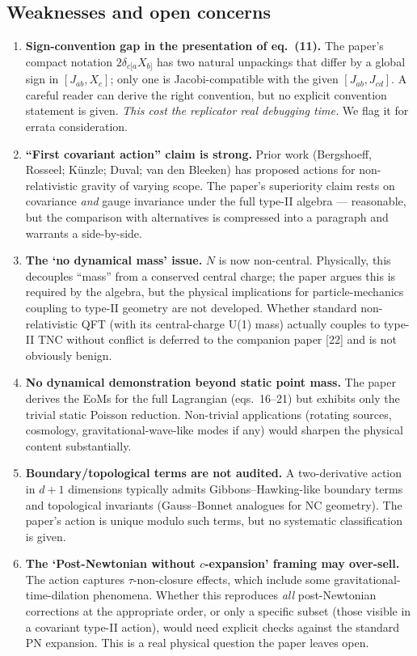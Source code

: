 \documentclass[11pt]{article}
\begin{document}
\subsection{Weaknesses and open concerns}
\begin{enumerate}
  \item {\bf Sign-convention gap in the presentation of eq.~(11).} The paper's
        compact notation $2\delta_{c[a}X_{b]}$ has two natural unpackings that
        differ by a global sign in $[J_{ab},X_c]$; only one is Jacobi-compatible
        with the given $[J_{ab},J_{cd}]$. A careful reader can derive the right
        convention, but no explicit convention statement is given.
        \emph{This cost the replicator real debugging time.} We flag it for
        errata consideration.
  \item {\bf ``First covariant action'' claim is strong.} Prior work
        (Bergshoeff, Rosseel; K\"unzle; Duval; van den Bleeken) has proposed
        actions for non-relativistic gravity of varying scope. The paper's
        superiority claim rests on covariance {\it and} gauge invariance under
        the full type-II algebra --- reasonable, but the comparison with
        alternatives is compressed into a paragraph and warrants a
        side-by-side.
  \item {\bf The `no dynamical mass' issue.} $N$ is now non-central. Physically,
        this decouples ``mass'' from a conserved central charge; the paper
        argues this is required by the algebra, but the physical implications
        for particle-mechanics coupling to type-II geometry are not developed.
        Whether standard non-relativistic QFT (with its central-charge U(1)
        mass) actually couples to type-II TNC without conflict is deferred to
        the companion paper [22] and is not obviously benign.
  \item {\bf No dynamical demonstration beyond static point mass.} The paper
        derives the EoMs for the full Lagrangian (eqs.~16--21) but exhibits
        only the trivial static Poisson reduction. Non-trivial applications
        (rotating sources, cosmology, gravitational-wave-like modes if any)
        would sharpen the physical content substantially.
  \item {\bf Boundary/topological terms are not audited.} A two-derivative
        action in $d+1$ dimensions typically admits Gibbons--Hawking-like
        boundary terms and topological invariants (Gauss--Bonnet analogues for
        NC geometry). The paper's action is unique modulo such terms, but no
        systematic classification is given.
  \item {\bf The `Post-Newtonian without $c$-expansion' framing may over-sell.}
        The action captures $\tau$-non-closure effects, which include some
        gravitational-time-dilation phenomena. Whether this reproduces
        \emph{all} post-Newtonian corrections at the appropriate order, or
        only a specific subset (those visible in a covariant type-II action),
        would need explicit checks against the standard PN expansion. This is
        a real physical question the paper leaves open.
\end{enumerate}
\end{document}
